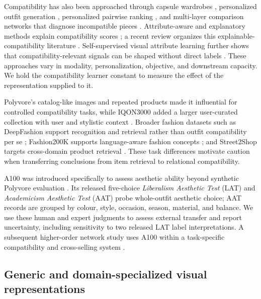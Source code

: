 \documentclass[preprint,12pt]{elsarticle}
\begin{document}
Compatibility has also been approached through capsule wardrobes \cite{hsiao2018capsule}, personalized outfit generation \cite{chen2019pog}, personalized pairwise ranking \cite{song2019gpbpr}, and multi-layer comparison networks that diagnose incompatible pieces \cite{wang2019mcn}. Attribute-aware and explanatory methods explain compatibility scores \cite{yang2019attributes,chen2019visualexplanations,lin2020explainable,balim2023diagnosing,wang2024pfe,li2024attribute}; a recent review organizes this explainable-compatibility literature \cite{selwon2024explainable}. Self-supervised visual attribute learning further shows that compatibility-relevant signals can be shaped without direct labels \cite{kim2021sval}. These approaches vary in modality, personalization, objective, and downstream capacity. We hold the compatibility learner constant to measure the effect of the representation supplied to it.

Polyvore's catalog-like images and repeated products made it influential for controlled compatibility tasks, while IQON3000 added a larger user-curated collection with user and stylistic context \cite{nakamura2018iqon}. Broader fashion datasets such as DeepFashion support recognition and retrieval rather than outfit compatibility per se \cite{liu2016deepfashion}; Fashion200K supports language-aware fashion concepts \cite{han2017spatial}; and Street2Shop targets cross-domain product retrieval \cite{kiapour2015street}. These task differences motivate caution when transferring conclusions from item retrieval to relational compatibility.

A100 was introduced specifically to assess aesthetic ability beyond synthetic Polyvore evaluation \cite{zou2022a100}. Its released five-choice \emph{Liberalism Aesthetic Test} (LAT) and \emph{Academicism Aesthetic Test} (AAT) probe whole-outfit aesthetic choice; AAT records are grouped by colour, style, occasion, season, material, and balance. We use these human and expert judgments to assess external transfer and report uncertainty, including sensitivity to two released LAT label interpretations. A subsequent higher-order network study uses A100 within a task-specific compatibility and cross-selling system \cite{pang2026crossselling}.

\subsection{Generic and domain-specialized visual representations}
\end{document}
